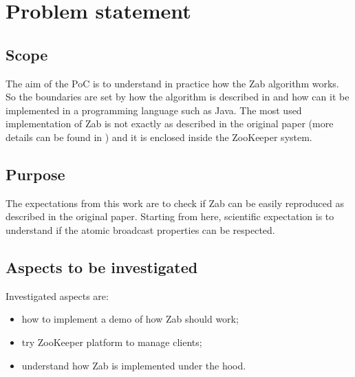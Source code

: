 \chapter{Problem statement\label{sec:problem}}

\section{Scope\label{sec:scope}}
The aim of the PoC is to understand in practice how the Zab algorithm works.
So the boundaries are set by how the algorithm is described in \cite{junqueira2011zab} and how can it be implemented in a programming language such as Java.
The most used implementation of Zab is not exactly as described in the original paper (more details can be found in \cite{medeiros2012zookeeper}) and it is enclosed inside the ZooKeeper system.

\section{Purpose\label{sec:purpose}}
The expectations from this work are to check if Zab can be easily reproduced as described in the original paper.
Starting from here, scientific expectation is to understand if the atomic broadcast properties can be respected.

\section{Aspects to be investigated\label{sec:aspects}}

Investigated aspects are:
\begin{itemize}
    \item how to implement a demo of how Zab should work;
    \item try ZooKeeper platform to manage clients;
    \item understand how Zab is implemented under the hood.
\end{itemize}